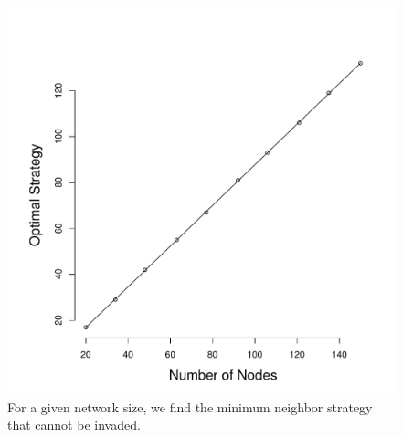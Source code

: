 \documentclass{article}
\begin{document}
\begin{figure}
\begin{center}
\includegraphics[scale=.5]{ess_strategy.pdf}
\end{center}
\caption{For a given network size, we find the minimum neighbor strategy that cannot be invaded.}
\label{ess_vs_size}
\end{figure}




\nocite{*}


\end{document}
